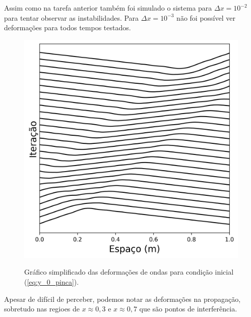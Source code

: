 \documentclass[a4paper, 11pt]{tufte-handout}
\begin{document}
Assim como na tarefa anterior também foi simulado o sistema para \( \Delta x = 10^{-2} \) para tentar
observar as instabilidades. Para \( \Delta x = 10^{-3} \) não foi possível ver deformações para todos
tempos testados.
\begin{figure}[h!] 
    \centering
    \caption{Gráfico simplificado das deformações de ondas para condição inicial (\ref{eq:y_0_pinca}).}
    \includegraphics[width=0.5\linewidth]{graf-tarefa2-c22}
    \label{fig:tarefa2_c}
\end{figure}

Apesar de difícil de perceber, podemos notar as deformações na propagação, sobretudo nas regioes de
\( x \approx 0,3 \) e \( x \approx 0,7\) que são pontos de interferência.
\end{document}
